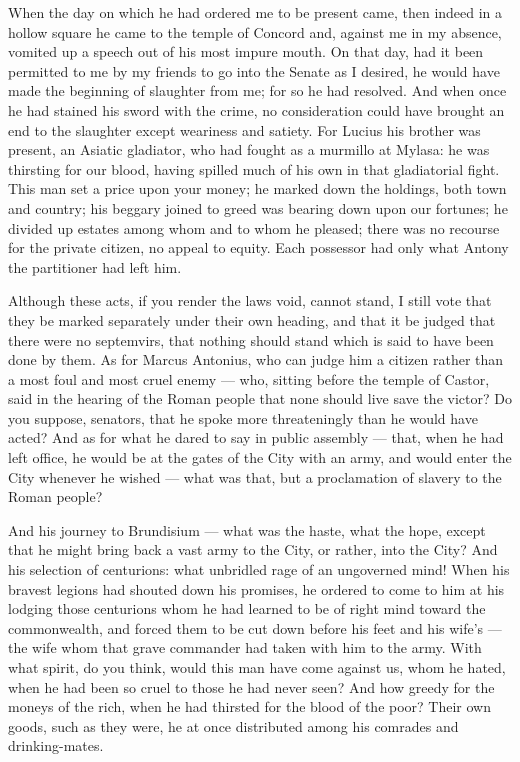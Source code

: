  When the day on which he had ordered me to be present came, then indeed in a hollow square he came to the temple of Concord and, against me in my absence, vomited up a speech out of his most impure mouth. On that day, had it been permitted to me by my friends to go into the Senate as I desired, he would have made the beginning of slaughter from me; for so he had resolved. And when once he had stained his sword with the crime, no consideration could have brought an end to the slaughter except weariness and satiety. For Lucius his brother was present, an Asiatic gladiator, who had fought as a murmillo at Mylasa: he was thirsting for our blood, having spilled much of his own in that gladiatorial fight. This man set a price upon your money; he marked down the holdings, both town and country; his beggary joined to greed was bearing down upon our fortunes; he divided up estates among whom and to whom he pleased; there was no recourse for the private citizen, no appeal to equity. Each possessor had only what Antony the partitioner had left him.

 Although these acts, if you render the laws void, cannot stand, I still vote that they be marked separately under their own heading, and that it be judged that there were no septemvirs, that nothing should stand which is said to have been done by them. As for Marcus Antonius, who can judge him a citizen rather than a most foul and most cruel enemy --- who, sitting before the temple of Castor, said in the hearing of the Roman people that none should live save the victor? Do you suppose, senators, that he spoke more threateningly than he would have acted? And as for what he dared to say in public assembly --- that, when he had left office, he would be at the gates of the City with an army, and would enter the City whenever he wished --- what was that, but a proclamation of slavery to the Roman people?

 And his journey to Brundisium --- what was the haste, what the hope, except that he might bring back a vast army to the City, or rather, into the City? And his selection of centurions: what unbridled rage of an ungoverned mind! When his bravest legions had shouted down his promises, he ordered to come to him at his lodging those centurions whom he had learned to be of right mind toward the commonwealth, and forced them to be cut down before his feet and his wife's --- the wife whom that grave commander had taken with him to the army. With what spirit, do you think, would this man have come against us, whom he hated, when he had been so cruel to those he had never seen? And how greedy for the moneys of the rich, when he had thirsted for the blood of the poor? Their own goods, such as they were, he at once distributed among his comrades and drinking-mates.

